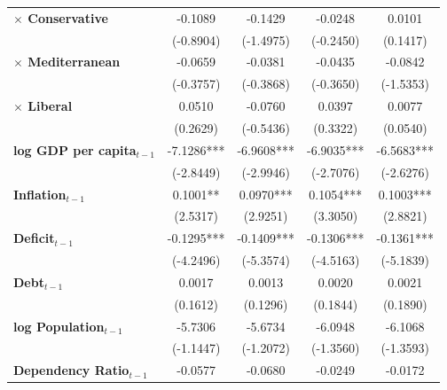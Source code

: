 \begin{center}
\begin{tabular}{lcccc}
\textbf{$\times$ Conservative}         &    -0.1089     &     -0.1429      &     -0.0248      &      0.0101       \\
\textbf{ }                         &   (-0.8904)    &    (-1.4975)     &    (-0.2450)     &     (0.1417)      \\
\textbf{$\times$ Mediterranean}        &    -0.0659     &     -0.0381      &     -0.0435      &     -0.0842       \\
\textbf{ }                         &   (-0.3757)    &    (-0.3868)     &    (-0.3650)     &    (-1.5353)      \\
\textbf{$\times$ Liberal}              &     0.0510     &     -0.0760      &      0.0397      &      0.0077       \\
\textbf{ }                         &    (0.2629)    &    (-0.5436)     &     (0.3322)     &     (0.0540)      \\
\textbf{log GDP per capita$_{t-1}$}           &   -7.1286***   &    -6.9608***    &    -6.9035***    &    -6.5683***     \\
\textbf{ }                         &   (-2.8449)    &    (-2.9946)     &    (-2.7076)     &    (-2.6276)      \\
\textbf{Inflation$_{t-1}$}      &    0.1001**    &    0.0970***     &    0.1054***     &    0.1003***      \\
\textbf{ }                         &    (2.5317)    &     (2.9251)     &     (3.3050)     &     (2.8821)      \\
\textbf{Deficit$_{t-1}$}             &   -0.1295***   &    -0.1409***    &    -0.1306***    &    -0.1361***     \\
\textbf{ }                         &   (-4.2496)    &    (-5.3574)     &    (-4.5163)     &    (-5.1839)      \\
\textbf{Debt$_{t-1}$}                &     0.0017     &      0.0013      &      0.0020      &      0.0021       \\
\textbf{ }                         &    (0.1612)    &     (0.1296)     &     (0.1844)     &     (0.1890)      \\
\textbf{log Population$_{t-1}$}      &    -5.7306     &     -5.6734      &     -6.0948      &     -6.1068       \\
\textbf{ }                         &   (-1.1447)    &    (-1.2072)     &    (-1.3560)     &    (-1.3593)      \\
\textbf{Dependency Ratio$_{t-1}$}   &    -0.0577     &     -0.0680      &     -0.0249      &     -0.0172       \\

\end{tabular}
\end{center}
